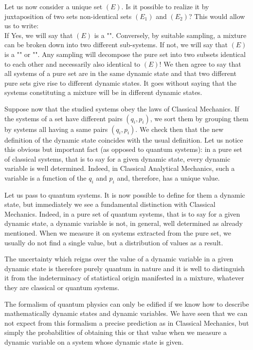 	Let us now consider a unique set $(E)$. Is it possible to realize it by juxtaposition of two sets non-identical sets $(E_1)$ and $(E_2)$? This would allow us to write:
	\\
	If Yes, we will say that $(E)$ is a "". Conversely, by suitable sampling, a mixture can be broken down into two different sub-systems. If not, we will say that $(E)$ is a "" or "". Any sampling will decompose the pure set into two subsets identical to each other and necessarily also identical to $(E)$! We then agree to say that all systems of a pure set are in the same dynamic state and that two different pure sets give rise to different dynamic states. It goes without saying that the systems constituting a mixture will be in different dynamic states.
	
	Suppose now that the studied systems obey the laws of Classical Mechanics. If the systems of a set have different pairs $(q_i,p_i)$, we sort them by grouping them by systems all having a same pairs $(q_i,p_i)$. We check then that the new definition of the dynamic state coincides with the usual definition. Let us notice this obvious but important fact (as opposed to quantum systems): in a pure set of classical systems, that is to say for a given dynamic state, every dynamic variable is well determined. Indeed, in Classical Analytical Mechanics, such a variable is a function of the $q_i$ and $p_i$ and, therefore, has a unique value.
	
	Let us pass to quantum systems. It is now possible to define for them a dynamic state, but immediately we see a fundamental distinction with Classical Mechanics. Indeed, in a pure set of quantum systems, that is to say for a given dynamic state, a dynamic variable is not, in general, well determined as already mentioned. When we measure it on systems extracted from the pure set, we usually do not find a single value, but a distribution of values as a result.
	
	The uncertainty which reigns over the value of a dynamic variable in a given dynamic state is therefore purely quantum in nature and it is well to distinguish it from the indeterminacy of statistical origin manifested in a mixture, whatever they are classical or quantum systems.
	
	The formalism of quantum physics can only be edified if we know how to describe mathematically dynamic states and dynamic variables. We have seen that we can not expect from this formalism a precise prediction as in Classical Mechanics, but simply the probabilities of obtaining this or that value when we measure a dynamic variable on a system whose dynamic state is given.
	
